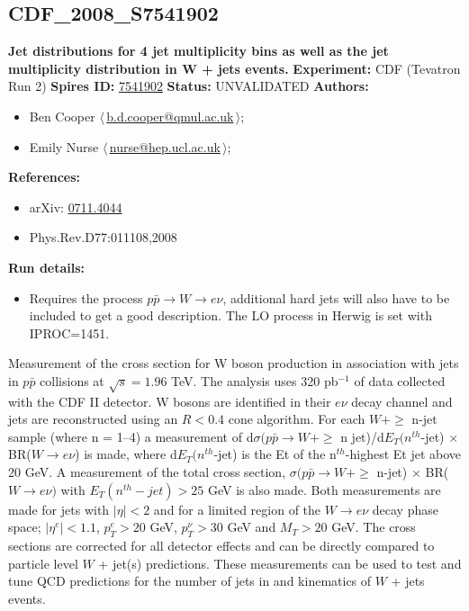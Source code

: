 \subsection[CDF\_2008\_S7541902]{CDF\_2008\_S7541902\,\cite{Aaltonen:2007ip}}
\textbf{Jet \pT distributions for 4 jet multiplicity bins as well as the jet multiplicity distribution in W + jets events.}\newline
\textbf{Experiment:} CDF (Tevatron Run 2) \newline
\textbf{Spires ID:} \href{http://www.slac.stanford.edu/spires/find/hep/www?rawcmd=key+7541902}{7541902}\newline
\textbf{Status:} UNVALIDATED\newline
\textbf{Authors:}
\begin{itemize}
  \item Ben Cooper $\langle\,$\href{mailto:b.d.cooper@qmul.ac.uk}{b.d.cooper@qmul.ac.uk}$\,\rangle$;
  \item Emily Nurse $\langle\,$\href{mailto:nurse@hep.ucl.ac.uk}{nurse@hep.ucl.ac.uk}$\,\rangle$;
\end{itemize}
\textbf{References:}
\begin{itemize}
  \item arXiv: \href{http://arxiv.org/abs/0711.4044}{0711.4044}
  \item Phys.Rev.D77:011108,2008
\end{itemize}
\textbf{Run details:}
\begin{itemize}

  \item Requires the process $p\bar{p} \rightarrow {W} \rightarrow{e}\nu$,  additional hard jets will also have to be included to get a good  description. The LO process in Herwig is set with IPROC=1451.\end{itemize}

\noindent Measurement of the cross section for W boson production in association with jets in $p\bar{p}$ collisions at $\sqrt{s}=1.96$ TeV. The analysis uses 320 pb$^{-1}$ of data collected with the CDF II detector. W bosons are identified in their $e\nu$ decay channel and jets are reconstructed using an $R < 0.4$ cone algorithm. For each $W + \geq$ n-jet sample (where n = 1--4) a measurement of d$\sigma({p}\bar{p} \rightarrow W + \geq$ n jet)/d$E_T(n^{th}$-jet) $\times$ BR($W \rightarrow{e}\nu$) is made, where d$E_T(n^{th}$-jet) is the Et of the n$^{th}$-highest Et jet above 20 GeV. A measurement of the total cross section, $\sigma(p\bar{p} \rightarrow W + \geq$ n-jet) $\times$ BR($W \rightarrow{e}\nu)$ with $E_T(n^{th}-jet) > 25$ GeV is also made. Both measurements are made for jets with $|\eta| < 2$ and for a limited region of the $W \rightarrow{e}\nu$ decay phase space; $|\eta^{e}| < 1.1$, $p_{T}^{e} > 20$ GeV, $p_{T}^{\nu} > 30$ GeV and $M_{T} > 20$ GeV. The cross sections are corrected for all detector effects and can be directly compared to particle level $W$ + jet(s) predictions. These measurements can be used to test and tune QCD predictions for the number of jets in and kinematics of $W$ + jets events.

